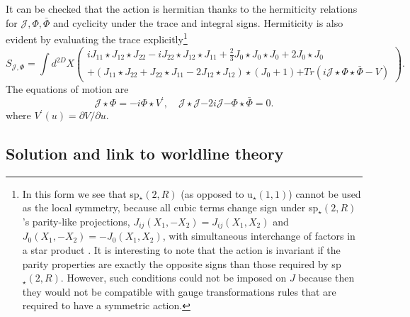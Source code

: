 \documentclass[a4paper,12pt]{article}
\begin{document}
It can be checked that the action is hermitian thanks to the hermiticity
relations for $\mathcal{J},\Phi ,\bar{\Phi}$ and cyclicity under the trace
and integral signs. Hermiticity is also evident by evaluating the trace
explicitly\footnote{%
In this form we see that sp$_{\star }\left( 2,R\right) $ (as opposed to u$%
_{\star }\left( 1,1\right) $) cannot be used as the local symmetry, because
all cubic terms change sign under sp$_{\star }\left( 2,R\right) $'s
parity-like projections, $J_{ij}\left( X_{1},-X_{2}\right) =J_{ij}\left(
X_{1},X_{2}\right) $ and $J_{0}\left( X_{1},-X_{2}\right) =-J_{0}\left(
X_{1},X_{2}\right) $, with simultaneous interchange of factors in a star
product \cite{ncOn}. It is interesting to note that the action is invariant
if the parity properties are exactly the opposite signs than those required
by sp$_{\star }\left( 2,R\right) .$ However, such conditions could not be
imposed on $J$ because then they would not be compatible with gauge
transformations rules that are required to have a symmetric action.} 
\[
S_{\mathcal{J},\Phi }=\int d^{2D}X\left( 
\begin{array}{c}
iJ_{11}\star J_{12}\star J_{22}-iJ_{22}\star J_{12}\star J_{11}+\frac{2}{3}%
J_{0}\star J_{0}\star J_{0}+2J_{0}\star J_{0} \\ 
+\left( J_{11}\star J_{22}+J_{22}\star J_{11}-2J_{12}\star J_{12}\right)
\star \left( J_{0}+1\right) \mathbf{+}Tr\left( i\mathcal{J}\star \Phi \star 
\bar{\Phi}-V\right)
\end{array}
\right) . 
\]
The equations of motion are 
\begin{equation}
\mathcal{J}\star \Phi =-i\Phi \star V^{\prime },\quad \mathcal{J}\star 
\mathcal{J}\mathbf{-}2i\mathcal{J}\mathbf{-}\Phi \star \bar{\Phi}\mathbf{=}0.
\label{generaleq}
\end{equation}
where $V^{\prime }\left( u\right) =\partial V/\partial u$.

\subsection{Solution and link to worldline theory}
\end{document}
